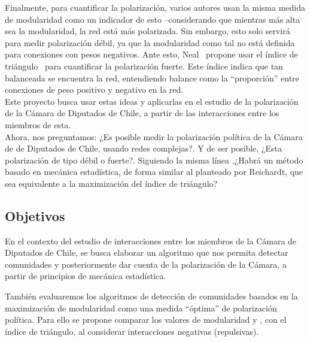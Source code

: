 \documentclass{proyectotesis}
\begin{document}
Finalmente, para cuantificar la polarización, varios autores usan la misma medida de modularidad como un indicador de esto --considerando que mientras más alta sea la modularidad, la red está más polarizada. Sin embargo, esto solo servirá para medir polarización débil, ya que la modularidad como tal no está definida para conexiones con pesos negativos. Ante esto, Neal~\cite{neal_sign_2020} propone usar el índice de triángulo~\cite{aref_measuring_2018} para cuantificar la polarización fuerte. Este índice indica que tan balanceada se encuentra la red, entendiendo balance como la ``proporción'' entre conexiones de peso positivo y negativo en la red.\\

Este proyecto busca usar estas ideas y aplicarlas en el estudio de la polarización de la Cámara de Diputados de Chile, a partir de las interacciones entre los miembros de esta. \\

Ahora, nos preguntamos: ¿Es posible medir la polarización política de la Cámara de de Diputados de Chile, usando redes complejas?. Y de ser posible, ¿Esta polarización de tipo débil o fuerte?. Siguiendo la misma línea ,¿Habrá un método basado en mecánica estadística, de forma similar al planteado por Reichardt, que sea equivalente a la maximización del índice de triángulo? %

\subsection{Objetivos}

En el contexto del estudio de interacciones entre los miembros de la Cámara de Diputados de Chile, se busca elaborar un algoritmo que nos permita detectar comunidades y posteriormente dar cuenta de la polarización de la Cámara, a partir de principios de mecánica estadística.

También evaluaremos los algoritmos de detección de comunidades basados en la maximización de modularidad como una medida ``óptima'' de polarización política. Para ello se propone comparar los valores de modularidad y , con el índice de triángulo, al considerar interacciones negativas (repulsivas). 
\end{document}
